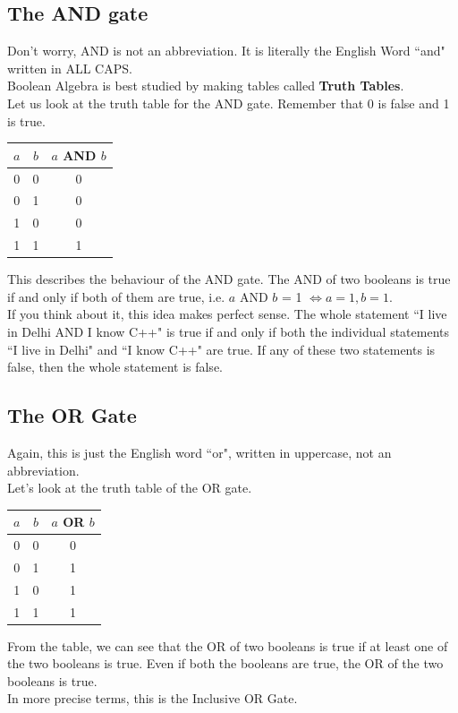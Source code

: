 \documentclass[letterpaper, 12pt]{book}
\begin{document}
\subsection{The AND gate}
Don't worry, AND is not an abbreviation. It is literally the English Word ``and" written in ALL CAPS.\\
Boolean Algebra is best studied by making tables called \textbf{Truth Tables}.\\
Let us look at the truth table for the AND gate. Remember that 0 is false and 1 is true.
\begin{center}
	\begin{tabular}{ |c|c|c| } 
		\hline
		$a$ & $b$ & $a$ AND $b$ \\ 
		\hline
		0 & 0 & 0 \\ 
		0 & 1 & 0 \\
		1 & 0 & 0 \\
		1 & 1 & 1 \\
		\hline
	\end{tabular}
\end{center}
This describes the behaviour of the AND gate. The AND of two booleans is true if and only if both of them are true, i.e. $a$ AND $b$ = 1 $\Leftrightarrow a = 1, b = 1$.\\
If you think about it, this idea makes perfect sense. The whole statement ``I live in Delhi AND I know C++" is true if and only if both the individual statements ``I live in Delhi" and ``I know C++" are true. If any of these two statements is false, then the whole statement is false.
\subsection{The OR Gate}
Again, this is just the English word ``or", written in uppercase, not an abbreviation.\\
Let's look at the truth table of the OR gate.\\
\begin{center}
	\begin{tabular}{ |c|c|c| } 
		\hline
		$a$ & $b$ & $a$ OR $b$ \\ 
		\hline
		0 & 0 & 0 \\ 
		0 & 1 & 1 \\
		1 & 0 & 1 \\
		1 & 1 & 1 \\
		\hline
	\end{tabular}
\end{center}
From the table, we can see that the OR of two booleans is true if at least one of the two booleans is true. Even if both the booleans are true, the OR of the two booleans is true.\\
In more precise terms, this is the Inclusive OR Gate.
\end{document}
